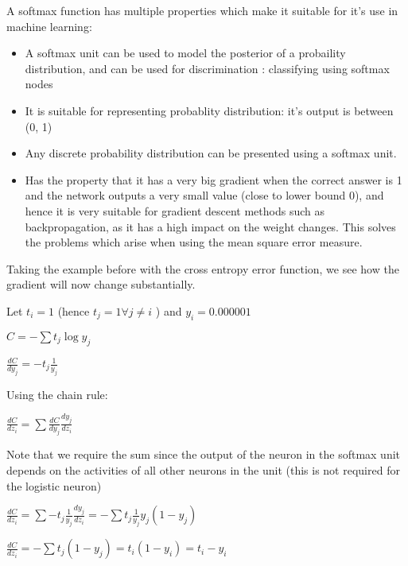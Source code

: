 \documentclass[11pt, fleqn, twoside]{article}
\begin{document}
  A softmax function has multiple properties which make it suitable for it's use in machine learning:

\begin{itemize}
  \item A softmax unit can be used to model the posterior of a probaility distribution, and can be used for discrimination
  : classifying using softmax nodes

  \item It is suitable for representing probablity distribution: it's output is between (0, 1)

  \item Any discrete probability distribution can be presented using a softmax unit.

  \item Has the property that it has a very big gradient when the correct answer is 1 and the network outputs a very small value (close to lower bound 0), and hence it is very suitable for gradient descent methods such as backpropagation, as it has a high impact on the weight changes.
  This solves the problems which arise when using the mean square error measure.
\end{itemize}

  Taking the example before with the cross entropy error function, we see how the gradient will now change substantially.

  Let $t_i = 1$ (hence $t_j = 1 \forall j \ne i$ ) and $y_i = 0.000001$

\begin{center} $C=- \sum{t_j \log{y_j}}$ \end{center}

\begin{center} $\frac {dC}{d {y_j}} = - {t_j} \frac {1} {y_j}$ \end{center}

Using the chain rule:
\begin{center} $\frac {dC}{d {z_i}} = \sum{ \frac{dC} {d{y_j}} \frac{d{y_j}}{d{z_i}} } $ \end{center}

Note that we require the sum since the output of the neuron in the softmax unit depends on the activities of all other neurons in the unit (this is not required for the logistic neuron)
\begin{center} $\frac {dC}{d {z_i}} = \sum{- {t_j} \frac {1} {y_j} \frac{d{y_j}}{d{z_i}} = - \sum{ {t_j} \frac {1} {y_j}  {y_j} (1 - {y_j})} } $\end{center}
\begin{center} $\frac {dC}{d {z_i}} = - \sum{{t_j} (1 - {y_j})} = {t_i} (1 - {y_i}) = {t_i} - {y_i}$ \end{center}
\end{document}
